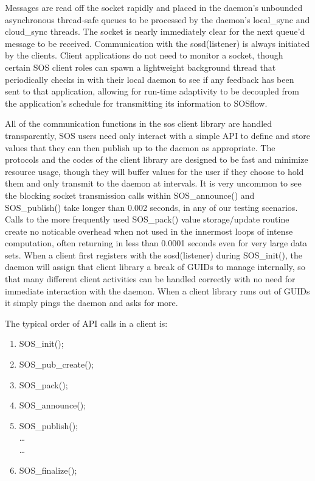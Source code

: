 Messages are read off the socket rapidly and placed in the daemon's
unbounded asynchronous thread-safe queues to be processed by the
daemon's local\_sync and cloud\_sync threads.
%
The socket is nearly immediately clear for the next queue'd message to
be received.
%
Communication with the sosd(listener) is always initiated by the
clients.
%
Client applications do not need to monitor a socket, though certain
SOS client roles can spawn a lightweight background thread that
periodically checks in with their local daemon to see if any feedback
has been sent to that application, allowing for run-time adaptivity to
be decoupled from the application's schedule for transmitting its
information to SOSflow.

All of the communication functions in the sos client library are
handled transparently, SOS users need only interact with a simple API
to define and store values that they can then publish up to the daemon
as appropriate.
%
The protocols and the codes of the client library are designed to be
fast and minimize resource usage, though they will buffer values for
the user if they choose to hold them and only transmit to the daemon
at intervals.
%
It is very uncommon to see the blocking socket transmission calls
within SOS\_announce() and SOS\_publish() take longer than 0.002
seconds, in any of our testing scenarios. Calls to the more frequently
used SOS\_pack() value storage/update routine create no noticable
overhead when not used in the innermost loops of intense computation,
often returning in less than 0.0001 seconds even for very large data
sets.
%
When a client first registers with the sosd(listener) during
SOS\_init(), the daemon will assign that client library a break of
GUIDs to manage internally, so that many different client activities
can be handled correctly with no need for immediate interaction with
the daemon.
%
When a client library runs out of GUIDs it simply pings the daemon and
asks for more.

The typical order of API calls in a client is:
%
\begin{enumerate}
    \item SOS\_init();
    \item SOS\_pub\_create();
    \item SOS\_pack();
    \item SOS\_announce();
    \item SOS\_publish();\\
    \dots\\
    \dots\\
    \item SOS\_finalize();
\end{enumerate}

